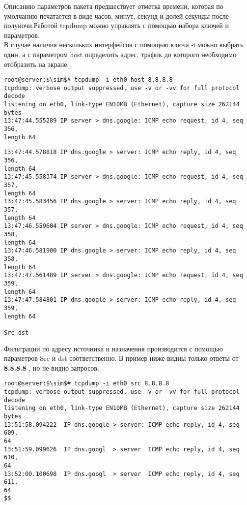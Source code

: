 \documentclass[14pt, a4paper]{article}
\begin{document}
Описанию параметров пакета предшествует отметка времени, которая по умолчанию печатается в
виде часов, минут, секунд и долей секунды после полуночи.Работой tcpdump можно управлять с
помощью набора ключей и параметров.\\

В случае наличия нескольких интерфейсов с помощью ключа -i можно выбрать один, а с параметром
\colorbox{backcolour}{host} определить адрес, трафик до которого необходимо отобразить на экране.

\vspace{0.3cm}
\begin{lstlisting}
root@server:$\sim$# tcpdump -i eth0 host 8.8.8.8
tcpdump: verbose output suppressed, use -v or -vv for full protocol decode
listening on eth0, link-type EN10MB (Ethernet), capture size 262144 bytes
13:47:44.555289 IP server > dns.google: ICMP echo request, id 4, seq 356, 
length 64
\end{lstlisting}

\newpage

\begin{lstlisting}
13:47:44.578818 IP dns.google > server: ICMP echo reply, id 4, seq 356, 
length 64
13:47:45.558374 IP server > dns.google: ICMP echo request, id 4, seq 357, 
length 64
13:47:45.583456 IP dns.google > server: ICMP echo reply, id 4, seq 357, 
length 64
13:47:46.559604 IP server > dns.google: ICMP echo request, id 4, seq 358, 
length 64
13:47:46.581900 IP dns.google > server: ICMP echo reply, id 4, seq 358, 
length 64
13:47:47.561489 IP server > dns.google: ICMP echo request, id 4, seq 359, 
length 64
13:47:47.584801 IP dns.google > server: ICMP echo reply, id 4, seq 359, 
length 64

Src dst
\end{lstlisting}
\vspace{0.2cm}

Фильтрации по адресу источника и назначения производится с помощью параметров \colorbox{backcolour}{Src} и \colorbox{backcolour}{dst}
соответственно. В пример ниже видны только ответы от \textbf{8.8.8.8} , но не видно запросов.

\vspace{0.3cm}
\begin{lstlisting}
root@server:$\sim$# tcpdump -i eth0 src 8.8.8.8
tcpdump: verbose output suppressed, use -v or -vv for full protocol decode
listening on eth0, link-type EN10MB (Ethernet), capture size 262144 bytes
13:51:58.094222  IP dns.google > server: ICMP echo reply, id 4, seq 609,
64
13:51:59.099626  IP dns.googl  > server  ICMP echo reply, id 4, seq 610,
64
13:52:00.100698  IP dns.googl  > server  ICMP echo reply, id 4, seq 611,
64
$$
\end{lstlisting}
\vspace{0.2cm}
\end{document}
